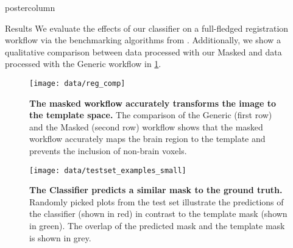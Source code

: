 \begin{frame}
\begin{columns}
\begin{column}{.59\textwidth}
\begin{beamercolorbox}[center]{postercolumn}
\begin{minipage}{.98\textwidth}
{                            \begin{myblock}{Results}
                                We evaluate the effects of our classifier on a full-fledged registration workflow via the benchmarking algorithms from \cite{irsabi}.
                                Additionally, we show a qualitative comparison between data processed with our Masked and data processed with the Generic workflow in \cref{reg_comp}.
                                \begin{figure}
                                    \texttt{[image: data/reg\_comp]}
                                    \caption{\textbf{The masked workflow accurately transforms the image to the template space.} The comparison of the Generic (first row) and the Masked (second row) workflow shows that the masked workflow accurately maps the brain region to the template and prevents the inclusion of non-brain voxels.}
                                    \label{reg_comp}
                                \end{figure}

                                \begin{figure}
                                    \texttt{[image: data/testset\_examples\_small]}
                                    \caption{\textbf{The Classifier predicts a similar mask to the ground truth.}
                                    Randomly picked plots from the test set illustrate the predictions of the classifier (shown in red) in contrast to the template mask (shown in green).
                                    The overlap of the predicted mask and the template mask is shown in grey.}
                                \end{figure}



\end{myblock}}
\end{minipage}
\end{beamercolorbox}
\end{column}
\end{columns}
\end{frame}
